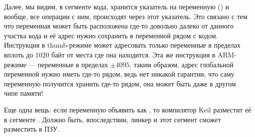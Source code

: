 Далее, мы видим, в сегменте кода, хранится указатель на переменную  () и вообще, все операции 
с ним, происходят через этот указатель.
Это связано с тем что переменная  может быть расположена где-то довольно далеко от данного участка кода
и её адрес нужно сохранить в переменной рядом с кодом.
Инструкция  в thumb-режиме может адресовать только переменные в пределах вплоть до 1020 байт от места
где она находится. Эта же инструкция в ARM-режиме --- переменные в пределах $\pm{}4095$, таким образом, 
адрес глобальной переменной  нужно иметь где-то рядом, ведь нет никакой гарантии, что саму переменную
получится хранить где-то рядом, она может быть даже в другом чипе памяти!

Еще одна вещь: если переменную объявить как , то компилятор Keil разместит её в сегменте .
Должно быть, впоследствии, линкер и этот сегмент сможет разместить в ПЗУ.

